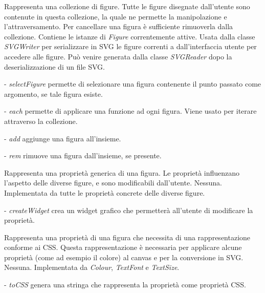 Rappresenta una collezione di figure. Tutte le figure disegnate dall'utente sono contenute in questa collezione, la quale ne permette la manipolazione e l'attraversamento. Per cancellare una figura \`e sufficiente rimuoverla dalla collezione.
Contiene le istanze di \textit{Figure} correntemente attive.
Usata dalla classe \textit{SVGWriter} per serializzare in SVG le figure correnti a dall'interfaccia utente per accedere alle figure. Pu\`o venire generata dalla classe \textit{SVGReader} dopo la deserializzazione di un file SVG.
\begin{elencopuntato}[\normindent]
\item[-]  \textit{selectFigure} permette di selezionare una figura contenente il punto passato come argomento, se tale figura esiste.
\item[-]  \textit{each} permette di applicare una funzione ad ogni figura. Viene usato per iterare attraverso la collezione.
\item[-]  \textit{add} aggiunge una figura all'insieme.
\item[-]  \textit{rem} rimuove una figura dall'insieme, se presente.
\end{elencopuntato}

Rappresenta una propriet\`a generica di una figura. Le propriet\`a influenzano 
l'aspetto delle diverse figure, e sono modificabili dall'utente.
Nessuna.
Implementata da tutte le propriet\`a concrete delle diverse figure.
\begin{elencopuntato}[\normindent]
\item[-] \textit{createWidget} crea un widget grafico che permetter\`a all'utente di modificare la propriet\`a.
\end{elencopuntato}

Rappresenta una propriet\`a di una figura che necessita di una rappresentazione conforme ai CSS. Questa rappresentazione \`e necessaria per applicare alcune propriet\`a (come ad esempio il colore) al canvas e per la conversione in SVG.
Nessuna.
Implementata da \textit{Colour}, \textit{TextFont} e \textit{TextSize}. 
\begin{elencopuntato}[\normindent]
\item[-] \textit{toCSS} genera una stringa che rappresenta la propriet\`a come propriet\`a CSS.
\end{elencopuntato}

